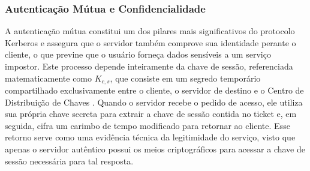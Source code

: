 
\subsubsection{Autenticação Mútua e Confidencialidade}
A autenticação mútua constitui um dos pilares mais significativos do protocolo Kerberos e assegura que o servidor também comprove sua identidade perante o cliente, o que previne que o usuário forneça dados sensíveis a um serviço impostor. Este processo depende inteiramente da chave de sessão, referenciada matematicamente como $K_{c,s}$, que consiste em um segredo temporário compartilhado exclusivamente entre o cliente, o servidor de destino e o Centro de Distribuição de Chaves \cite{neuman1994}. Quando o servidor recebe o pedido de acesso, ele utiliza sua própria chave secreta para extrair a chave de sessão contida no ticket e, em seguida, cifra um carimbo de tempo modificado para retornar ao cliente. Esse retorno serve como uma evidência técnica da legitimidade do serviço, visto que apenas o servidor autêntico possui os meios criptográficos para acessar a chave de sessão necessária para tal resposta.

